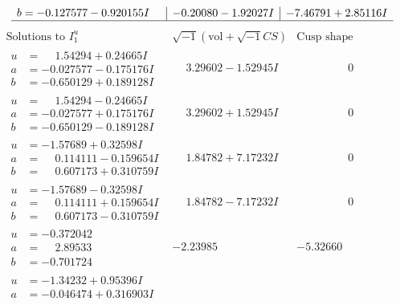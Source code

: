 \documentclass[1p]{elsarticle_modified}
\theoremstyle{definition}
\newcommand{\I}{\sqrt{-1}}
\begin{document}
$$\begin{array}{c|c|c}
\begin{aligned}
b &= -0.127577 - 0.920155 I\end{aligned}
 & -0.20080 - 1.92027 I & -7.46791 + 2.85116 I\\
 \hline 
 \end{array}$$\newpage$$\begin{array}{c|c|c}  
\text{Solutions to }I^u_{1}& \I (\text{vol} + \sqrt{-1}CS) & \text{Cusp shape}\\
 \hline 
\begin{aligned}
u &= \phantom{-}1.54294 + 0.24665 I \\
a &= -0.027577 - 0.175176 I \\
b &= -0.650129 + 0.189128 I\end{aligned}
 & \phantom{-}3.29602 - 1.52945 I & \phantom{-0.000000 } 0 \\ \hline\begin{aligned}
u &= \phantom{-}1.54294 - 0.24665 I \\
a &= -0.027577 + 0.175176 I \\
b &= -0.650129 - 0.189128 I\end{aligned}
 & \phantom{-}3.29602 + 1.52945 I & \phantom{-0.000000 } 0 \\ \hline\begin{aligned}
u &= -1.57689 + 0.32598 I \\
a &= \phantom{-}0.114111 - 0.159654 I \\
b &= \phantom{-}0.607173 + 0.310759 I\end{aligned}
 & \phantom{-}1.84782 + 7.17232 I & \phantom{-0.000000 } 0 \\ \hline\begin{aligned}
u &= -1.57689 - 0.32598 I \\
a &= \phantom{-}0.114111 + 0.159654 I \\
b &= \phantom{-}0.607173 - 0.310759 I\end{aligned}
 & \phantom{-}1.84782 - 7.17232 I & \phantom{-0.000000 } 0 \\ \hline\begin{aligned}
u &= -0.372042\phantom{ +0.000000I} \\
a &= \phantom{-}2.89533\phantom{ +0.000000I} \\
b &= -0.701724\phantom{ +0.000000I}\end{aligned}
 & -2.23985\phantom{ +0.000000I} & -5.32660\phantom{ +0.000000I} \\ \hline\begin{aligned}
u &= -1.34232 + 0.95396 I \\
a &= -0.046474 + 0.316903 I \\

\end{aligned}
\end{array}$$
\end{document}
